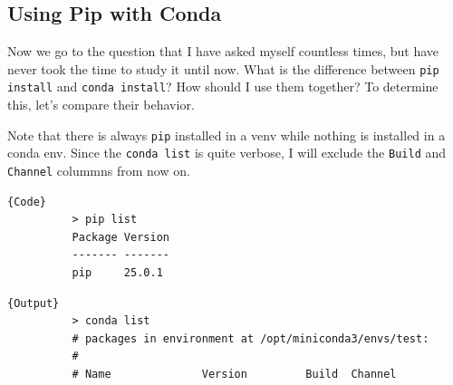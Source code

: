 \documentclass{article}
\begin{document}
  \subsection{Using Pip with Conda} 

    Now we go to the question that I have asked myself countless times, but have never took the time to study it until now. What is the difference between \texttt{pip install} and \texttt{conda install}? How should I use them together? To determine this, let's compare their behavior.  

    \begin{example}
      Note that there is always \texttt{pip} installed in a venv while nothing is installed in a conda env. Since the \texttt{conda list} is quite verbose, I will exclude the \texttt{Build} and \texttt{Channel} colummns from now on. 

      \noindent\begin{minipage}{.25\textwidth}
        \begin{lstlisting}[]{Code}
          > pip list
          Package Version
          ------- -------
          pip     25.0.1 
        \end{lstlisting}
        \end{minipage}
        \hfill
        \begin{minipage}{.74\textwidth}
        \begin{lstlisting}[]{Output}
          > conda list
          # packages in environment at /opt/miniconda3/envs/test:
          #
          # Name              Version         Build  Channel 
        \end{lstlisting}
      \end{minipage}
    \end{example}
\end{document}
